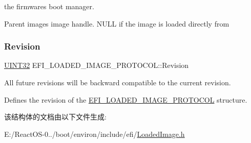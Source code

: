 the firmware\textquotesingle{}s boot manager. 

Parent image\textquotesingle{}s image handle. N\+U\+LL if the image is loaded directly from \mbox{\label{struct_e_f_i___l_o_a_d_e_d___i_m_a_g_e___p_r_o_t_o_c_o_l_a6b0ddaba01d4136da11f30772d583c85}} 
\subsubsection{\texorpdfstring{Revision}{Revision}}
{\footnotesize\ttfamily \hyperlink{_processor_bind_8h_ae1e6edbbc26d6fbc71a90190d0266018}{U\+I\+N\+T32} E\+F\+I\+\_\+\+L\+O\+A\+D\+E\+D\+\_\+\+I\+M\+A\+G\+E\+\_\+\+P\+R\+O\+T\+O\+C\+O\+L\+::\+Revision}



All future revisions will be backward compatible to the current revision. 

Defines the revision of the \hyperlink{struct_e_f_i___l_o_a_d_e_d___i_m_a_g_e___p_r_o_t_o_c_o_l}{E\+F\+I\+\_\+\+L\+O\+A\+D\+E\+D\+\_\+\+I\+M\+A\+G\+E\+\_\+\+P\+R\+O\+T\+O\+C\+OL} structure. 

该结构体的文档由以下文件生成\+:\begin{DoxyCompactItemize}
\item 
E\+:/\+React\+O\+S-\/0../boot/environ/include/efi/\hyperlink{_loaded_image_8h}{Loaded\+Image.\+h}\end{DoxyCompactItemize}

